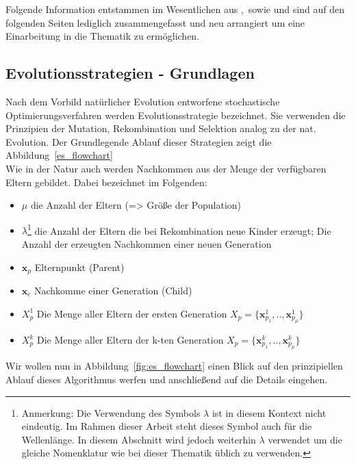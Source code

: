 \label{seq:EvolutionaryStrategies}
Folgende Information entstammen im Wesentlichen aus \cite{kost2003optimierung},\cite{bronstejn2012taschenbuch}\ sowie \cite{Hansen:1} und sind auf den folgenden Seiten lediglich zusammengefasst und neu arrangiert um eine Einarbeitung in die Thematik zu ermöglichen.\\
\subsection{Evolutionsstrategien - Grundlagen }
%
Nach dem Vorbild natürlicher Evolution entworfene stochastische Optimierungsverfahren werden Evolutionsstrategie bezeichnet. Sie verwenden die Prinzipien der Mutation, Rekombination und Selektion analog zu der nat. Evolution. Der Grundlegende Ablauf dieser Strategien zeigt die Abbildung~\ref{es_flowchart}\\
Wie in der Natur auch werden Nachkommen aus der Menge der verfügbaren Eltern gebildet. Dabei bezeichnet im Folgenden:
%
\begin{itemize}
	\item $\mu$ die Anzahl der Eltern (=> Größe der Population)
	\item $\lambda$\footnote{Anmerkung: Die Verwendung des Symbols $\lambda$ ist in diesem Kontext nicht eindeutig. Im Rahmen dieser Arbeit steht dieses Symbol auch für die Wellenlänge. In diesem Abschnitt wird jedoch weiterhin $\lambda$ verwendet um die gleiche Nomenklatur wie bei dieser Thematik üblich zu verwenden.} die Anzahl der Eltern die bei Rekombination neue Kinder erzeugt; Die Anzahl der erzeugten Nachkommen einer neuen Generation
	\item $\mathbf{x}_p$ Elternpunkt (Parent)
	\item $\mathbf{x}_c$ Nachkomme einer Generation (Child)
	\item $X_p^1$ Die Menge aller Eltern der ersten Generation $X_p = \{\mathbf{x}_{p_1}^1,..,\mathbf{x}_{p_\mu}^1\}$
	\item $X_p^k$ Die Menge aller Eltern der k-ten Generation $X_p = \{\mathbf{x}_{p_1}^k,..,\mathbf{x}_{p_\mu}^k\}$
\end{itemize}
%
Wir wollen nun in Abbildung~\ref{fig:es_flowchart} einen Blick auf den prinzipiellen Ablauf dieses Algorithmus werfen und anschließend auf die Details eingehen.
%

